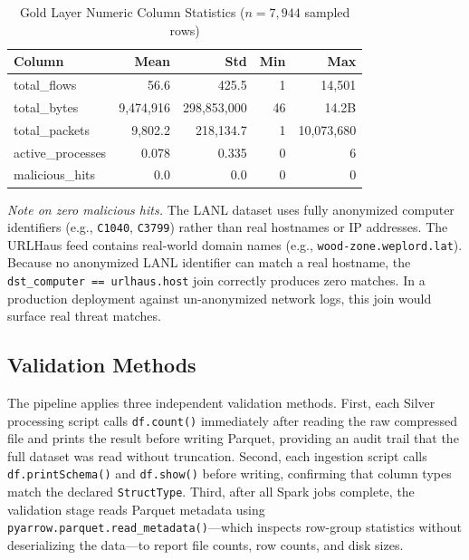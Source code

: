 \documentclass[conference]{IEEEtran}
\begin{document}
\begin{table}[htbp]
\caption{Gold Layer Numeric Column Statistics ($n=7{,}944$ sampled rows)}
\label{tab:goldstats}
\centering
\small
\begin{tabular}{lrrrr}
\toprule
\textbf{Column} & \textbf{Mean} & \textbf{Std} & \textbf{Min} & \textbf{Max} \\
\midrule
total\_flows      & 56.6      & 425.5       & 1       & 14,501 \\
total\_bytes      & 9,474,916 & 298,853,000 & 46      & 14.2B \\
total\_packets    & 9,802.2   & 218,134.7   & 1       & 10,073,680 \\
active\_processes & 0.078     & 0.335       & 0       & 6 \\
malicious\_hits   & 0.0       & 0.0         & 0       & 0 \\
\bottomrule
\end{tabular}
\end{table}

\textit{Note on zero malicious hits.} The LANL dataset uses fully anonymized computer identifiers (e.g., \texttt{C1040}, \texttt{C3799}) rather than real hostnames or IP addresses. The URLHaus feed contains real-world domain names (e.g., \texttt{wood-zone.weplord.lat}). Because no anonymized LANL identifier can match a real hostname, the \texttt{dst\_computer == urlhaus.host} join correctly produces zero matches. In a production deployment against un-anonymized network logs, this join would surface real threat matches.

\subsection{Validation Methods}

The pipeline applies three independent validation methods. First, each Silver processing script calls \texttt{df.count()} immediately after reading the raw compressed file and prints the result before writing Parquet, providing an audit trail that the full dataset was read without truncation. Second, each ingestion script calls \texttt{df.printSchema()} and \texttt{df.show()} before writing, confirming that column types match the declared \texttt{StructType}. Third, after all Spark jobs complete, the validation stage reads Parquet metadata using \texttt{pyarrow.parquet.read\_metadata()}---which inspects row-group statistics without deserializing the data---to report file counts, row counts, and disk sizes.
\end{document}
